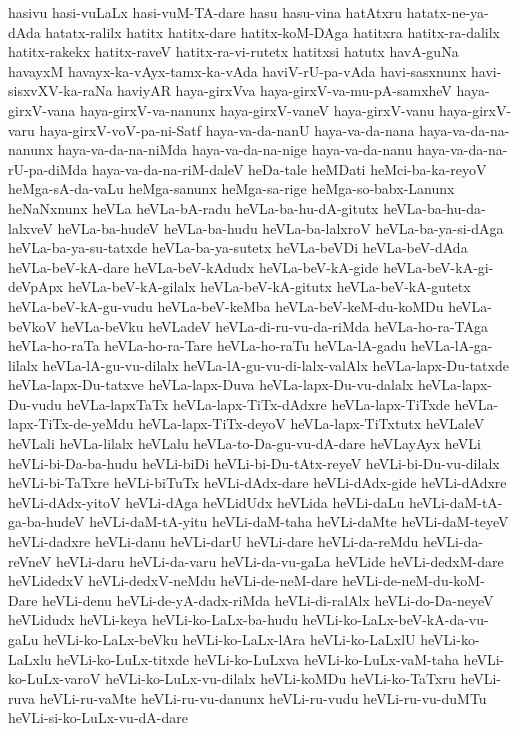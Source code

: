 {hasivu
hasi-vuLaLx
hasi-vuM-TA-dare
hasu
hasu-vina
hatAtxru
hatatx-ne-ya-dAda
hatatx-ralilx
hatitx
hatitx-dare
hatitx-koM-DAga
hatitxra
hatitx-ra-dalilx
hatitx-rakekx
hatitx-raveV
hatitx-ra-vi-rutetx
hatitxsi
hatutx
havA-guNa
havayxM
havayx-ka-vAyx-tamx-ka-vAda
haviV-rU-pa-vAda
havi-sasxnunx
havi-sisxvXV-ka-raNa
haviyAR
haya-girxVva
haya-girxV-va-mu-pA-samxheV
haya-girxV-vana
haya-girxV-va-nanunx
haya-girxV-vaneV
haya-girxV-vanu
haya-girxV-varu
haya-girxV-voV-pa-ni-Satf
haya-va-da-nanU
haya-va-da-nana
haya-va-da-na-nanunx
haya-va-da-na-niMda
haya-va-da-na-nige
haya-va-da-nanu
haya-va-da-na-rU-pa-diMda
haya-va-da-na-riM-daleV
heDa-tale
heMDati
heMci-ba-ka-reyoV
heMga-sA-da-vaLu
heMga-sanunx
heMga-sa-rige
heMga-so-babx-Lanunx
heNaNxnunx
heVLa
heVLa-bA-radu
heVLa-ba-hu-dA-gitutx
heVLa-ba-hu-da-lalxveV
heVLa-ba-hudeV
heVLa-ba-hudu
heVLa-ba-lalxroV
heVLa-ba-ya-si-dAga
heVLa-ba-ya-su-tatxde
heVLa-ba-ya-sutetx
heVLa-beVDi
heVLa-beV-dAda
heVLa-beV-kA-dare
heVLa-beV-kAdudx
heVLa-beV-kA-gide
heVLa-beV-kA-gi-deVpApx
heVLa-beV-kA-gilalx
heVLa-beV-kA-gitutx
heVLa-beV-kA-gutetx
heVLa-beV-kA-gu-vudu
heVLa-beV-keMba
heVLa-beV-keM-du-koMDu
heVLa-beVkoV
heVLa-beVku
heVLadeV
heVLa-di-ru-vu-da-riMda
heVLa-ho-ra-TAga
heVLa-ho-raTa
heVLa-ho-ra-Tare
heVLa-ho-raTu
heVLa-lA-gadu
heVLa-lA-ga-lilalx
heVLa-lA-gu-vu-dilalx
heVLa-lA-gu-vu-di-lalx-valAlx
heVLa-lapx-Du-tatxde
heVLa-lapx-Du-tatxve
heVLa-lapx-Duva
heVLa-lapx-Du-vu-dalalx
heVLa-lapx-Du-vudu
heVLa-lapxTaTx
heVLa-lapx-TiTx-dAdxre
heVLa-lapx-TiTxde
heVLa-lapx-TiTx-de-yeMdu
heVLa-lapx-TiTx-deyoV
heVLa-lapx-TiTxtutx
heVLaleV
heVLali
heVLa-lilalx
heVLalu
heVLa-to-Da-gu-vu-dA-dare
heVLayAyx
heVLi
heVLi-bi-Da-ba-hudu
heVLi-biDi
heVLi-bi-Du-tAtx-reyeV
heVLi-bi-Du-vu-dilalx
heVLi-bi-TaTxre
heVLi-biTuTx
heVLi-dAdx-dare
heVLi-dAdx-gide
heVLi-dAdxre
heVLi-dAdx-yitoV
heVLi-dAga
heVLidUdx
heVLida
heVLi-daLu
heVLi-daM-tA-ga-ba-hudeV
heVLi-daM-tA-yitu
heVLi-daM-taha
heVLi-daMte
heVLi-daM-teyeV
heVLi-dadxre
heVLi-danu
heVLi-darU
heVLi-dare
heVLi-da-reMdu
heVLi-da-reVneV
heVLi-daru
heVLi-da-varu
heVLi-da-vu-gaLa
heVLide
heVLi-dedxM-dare
heVLidedxV
heVLi-dedxV-neMdu
heVLi-de-neM-dare
heVLi-de-neM-du-koM-Dare
heVLi-denu
heVLi-de-yA-dadx-riMda
heVLi-di-ralAlx
heVLi-do-Da-neyeV
heVLidudx
heVLi-keya
heVLi-ko-LaLx-ba-hudu
heVLi-ko-LaLx-beV-kA-da-vu-gaLu
heVLi-ko-LaLx-beVku
heVLi-ko-LaLx-lAra
heVLi-ko-LaLxlU
heVLi-ko-LaLxlu
heVLi-ko-LuLx-titxde
heVLi-ko-LuLxva
heVLi-ko-LuLx-vaM-taha
heVLi-ko-LuLx-varoV
heVLi-ko-LuLx-vu-dilalx
heVLi-koMDu
heVLi-ko-TaTxru
heVLi-ruva
heVLi-ru-vaMte
heVLi-ru-vu-danunx
heVLi-ru-vudu
heVLi-ru-vu-duMTu
heVLi-si-ko-LuLx-vu-dA-dare
}
